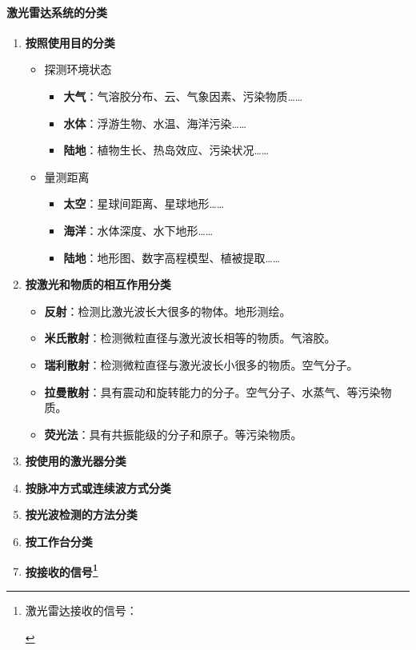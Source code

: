 \paragraph{激光雷达系统的分类}
\begin{enumerate}
	\item \textbf{按照使用目的分类}
		\begin{itemize}
			\item 探测环境状态
				\begin{itemize}
					\item \textbf{大气}：气溶胶分布、云、气象因素、污染物质……
					\item \textbf{水体}：浮游生物、水温、海洋污染……
					\item \textbf{陆地}：植物生长、热岛效应、污染状况……
				\end{itemize} %
			\item 量测距离
				\begin{itemize}
					\item \textbf{太空}：星球间距离、星球地形……
					\item \textbf{海洋}：水体深度、水下地形……
					\item \textbf{陆地}：地形图、数字高程模型、植被提取……
				\end{itemize} %
		\end{itemize} %
	\item \textbf{按激光和物质的相互作用分类}
		\begin{itemize}
			\item \textbf{反射}：检测比激光波长大很多的物体。地形测绘。
			\item \textbf{米氏散射}：检测微粒直径与激光波长相等的物质。气溶胶。
			\item \textbf{瑞利散射}：检测微粒直径与激光波长小很多的物质。空气分子。
			\item \textbf{拉曼散射}：具有震动和旋转能力的分子。空气分子、水蒸气、等污染物质。
			\item \textbf{荧光法}：具有共振能级的分子和原子。等污染物质。
		\end{itemize} %
	\item \textbf{按使用的激光器分类}
	\item \textbf{按脉冲方式或连续波方式分类}
	\item \textbf{按光波检测的方法分类}
	\item \textbf{按工作台分类}
	\item \textbf{按接收的信号\footnote{激光雷达接收的信号：\begin{itemize}

\end{itemize}}}
\end{enumerate}

